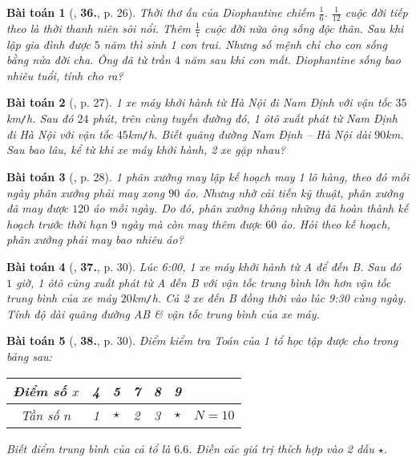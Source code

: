 \documentclass{article}
\numberwithin{equation}{section}
\newtheorem{baitoan}{Bài toán}
\begin{document}
\begin{baitoan}[\cite{SGK_Toan_8_tap_2}, \textbf{36.}, p. 26]
	Thời thơ ấu của Diophantine chiếm $\frac{1}{6}$. $\frac{1}{12}$ cuộc đời tiếp theo là thời thanh niên sôi nổi. Thêm $\frac{1}{7}$ cuộc đời nữa ông sống độc thân. Sau khi lập gia đình được $5$ năm thì sinh 1 con trai. Nhưng số mệnh chỉ cho con sống bằng nửa đời cha. Ông đã từ trần $4$ năm sau khi con mất. Diophantine sống bao nhiêu tuổi, tính cho ra?
\end{baitoan}

\begin{baitoan}[\cite{SGK_Toan_8_tap_2}, p. 27]
	1 xe máy khởi hành từ Hà Nội đi Nam Định với vận tốc $35$\emph{km\texttt{/}h}. Sau đó $24$ phút, trên cùng tuyến đường đó, 1 ôtô xuất phát từ Nam Định đi Hà Nội với vận tốc $45$\emph{km\texttt{/}h}. Biết quãng đường Nam Định -- Hà Nội dài $90$\emph{km}. Sau bao lâu, kể từ khi xe máy khởi hành, 2 xe gặp nhau?
\end{baitoan}

\begin{baitoan}[\cite{SGK_Toan_8_tap_2}, p. 28]
	1 phân xưởng may lập kế hoạch may 1 lô hàng, theo đó mỗi ngày phân xưởng phải may xong $90$ áo. Nhưng nhờ cải tiến kỹ thuật, phân xưởng đã may được $120$ áo mỗi ngày. Do đó, phân xưởng không những đã hoàn thành kế hoạch trước thời hạn $9$ ngày mà còn may thêm được $60$ áo. Hỏi theo kế hoạch, phân xưởng phải may bao nhiêu áo?
\end{baitoan}

\begin{baitoan}[\cite{SGK_Toan_8_tap_2}, \textbf{37.}, p. 30]
	Lúc 6:00, 1 xe máy khởi hành từ A để đến B. Sau đó $1$ giờ, 1 ôtô cũng xuất phát từ A đến B với vận tốc trung bình lớn hơn vận tốc trung bình của xe máy $20$\emph{km\texttt{/}h}. Cả 2 xe đến B đồng thời vào lúc 9:30 cùng ngày. Tính độ dài quãng đường AB \& vận tốc trung bình của xe máy.
\end{baitoan}

\begin{baitoan}[\cite{SGK_Toan_8_tap_2}, \textbf{38.}, p. 30]
	Điểm kiểm tra Toán của 1 tổ học tập được cho trong bảng sau:
	\begin{table}[H]
		\centering
		\begin{tabular}{|c|c|c|c|c|c|c|}
			\hline
			Điểm số $x$ & 4 & 5 & 7 & 8 & 9 &  \\
			\hline
			Tần số $n$ & 1 & $\star$ & 2 & 3 & $\star$ & $N = 10$ \\
			\hline
		\end{tabular}
	\end{table}
	Biết điểm trung bình của cả tổ là $6.6$. Điền các giá trị thích hợp vào 2 dấu $\star$.
\end{baitoan}
\end{document}
